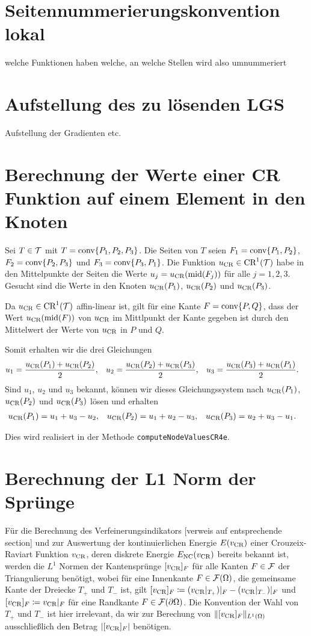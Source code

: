 \section{Seitennummerierungskonvention lokal}
welche Funktionen haben welche, an 
welche Stellen wird also umnummeriert

\section{Aufstellung des zu lösenden LGS}
Aufstellung der Gradienten etc.
 
\section{Berechnung der Werte einer CR Funktion auf einem Element in den Knoten}
Sei $T\in\mathcal{T}$ mit $T = \textup{conv}\{P_1, P_2, P_3\}$. Die Seiten 
von $T$ seien $F_1 = \textup{conv}\{P_1,P_2\}$, $F_2 = \textup{conv}\{P_2,P_3\}$ und $F_3 =
\textup{conv}\{P_3,P_1\}$. Die Funktion
$u_\textup{CR}\in\textup{CR}^1(\mathcal{T})$ habe in den Mittelpunkte der Seiten die Werte $u_j =
u_\textup{CR}(\textup{mid}(F_j))$ für alle $j=1,2,3$. Gesucht sind die Werte in den Knoten
$u_\textup{CR}(P_1)$, $u_\textup{CR}(P_2)$ und $u_\textup{CR}(P_3)$.

Da $u_\textup{CR}\in\textup{CR}^1(\mathcal{T})$ affin-linear ist, gilt für eine Kante
$F=\textup{conv}\{P,Q\}$, dass der Wert $u_\textup{CR}(\textup{mid}(F))$ von $u_\textup{CR}$ im Mittlpunkt 
der Kante gegeben ist durch den Mittelwert der Werte von $u_\textup{CR}$ in $P$ und $Q$.

Somit erhalten wir die drei Gleichungen
\begin{align*}
  u_1 &= \frac{u_\textup{CR}(P_1)+u_\textup{CR}(P_2)}{2},  
  &u_2 &= \frac{u_\textup{CR}(P_2)+u_\textup{CR}(P_3)}{2},  
  &u_3 &= \frac{u_\textup{CR}(P_3)+u_\textup{CR}(P_1)}{2}.
\end{align*}
Sind $u_1$, $u_2$ und $u_3$ bekannt, können wir dieses Gleichungssystem nach 
$u_\textup{CR}(P_1)$, $u_\textup{CR}(P_2)$ und $u_\textup{CR}(P_3)$ lösen und erhalten
\begin{align*}
 u_\textup{CR}(P_1)&=u_1+u_3-u_2, &u_\textup{CR}(P_2)&= u_1+u_2-u_3,&u_\textup{CR}(P_3)&=u_2+u_3-u_1.
\end{align*}

Dies wird realisiert in der Methode \texttt{computeNodeValuesCR4e}.

\section{Berechnung der L1 Norm der Sprünge}
Für die Berechnung des Verfeinerungsindikators [verweis auf entsprechende
section] und zur Auswertung der kontinuierlichen Energie $E(v_\textup{CR})$ einer 
Crouzeix-Raviart Funktion $v_\textup{CR}$, deren diskrete Energie $E_\textup{NC}(v_\textup{CR})$
bereits bekannt ist, werden die $L^1$ Normen der Kantensprünge 
$[v_\textup{CR}]_F$ für alle Kanten $F\in\mathcal{F}$ der Triangulierung benötigt,
wobei für eine Innenkante $F\in\mathcal{F}(\Omega)$, die gemeinsame Kante der
Dreiecke $T_+$ und $T_-$ ist, gilt
$[v_\textup{CR}]_F\coloneqq (v_\textup{CR}|_{T_+})|_F-(v_\textup{CR}|_{T_-})|_F$
und $[v_\textup{CR}]_F \coloneqq v_\textup{CR}|_F$ für eine Randkante
$F\in\mathcal{F}(\partial\Omega)$. Die Konvention der Wahl von
$T_+$ und $T_-$ ist hier irrelevant, da wir
zur Berechung von $\Vert [v_\textup{CR}]_F\Vert_{L^1(\Omega)}$
ausschließlich den Betrag $|[v_\textup{CR}]_F|$ benötigen.

